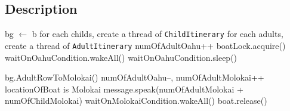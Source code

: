 \documentclass{article}
\begin{document}
\subsection{Description}
\begin{algorithm}
    \begin{algorithmic}
        \State bg $\leftarrow$ b
        \State for each childs, create a thread of \texttt{ChildItinerary}
        \State for each adults, create a thread of \texttt{AdultItinerary}
        \EndWhile
    \EndProcedure
        \State numOfAdultOahu++
        \State boatLock.acquire()
                \State waitOnOahuCondition.wakeAll()
            \EndIf
            \State waitOnOahuCondition.sleep()
        \EndWhile
        
        \State bg.AdultRowToMolokai()
        \State numOfAdultOahu--, numOfAdultMolokai++
        \State locationOfBoat is Molokai
        \State message.speak(numOfAdultMolokai + numOfChildMolokai)
        \State waitOnMolokaiCondition.wakeAll()
        \State boat.release()        
    \EndProcedure
    \end{algorithmic}
\end{algorithm}
\end{document}
